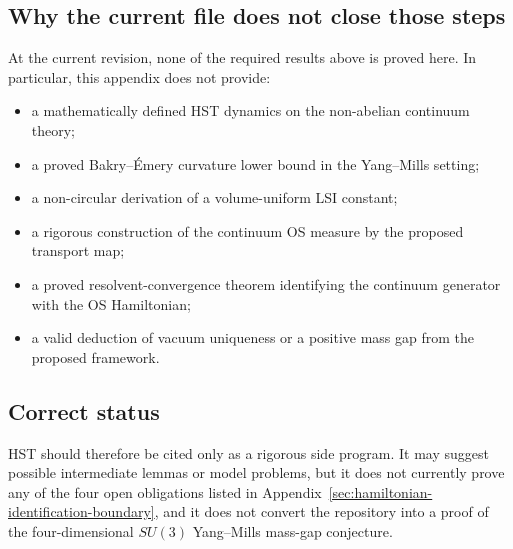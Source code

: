 \subsection{Why the current file does not close those steps}
At the current revision, none of the required results above is proved here.
In particular, this appendix does not provide:
\begin{itemize}
\item a mathematically defined HST dynamics on the non-abelian continuum theory;
\item a proved Bakry--\'Emery curvature lower bound in the Yang--Mills setting;
\item a non-circular derivation of a volume-uniform LSI constant;
\item a rigorous construction of the continuum OS measure by the proposed
transport map;
\item a proved resolvent-convergence theorem identifying the continuum generator
with the OS Hamiltonian;
\item a valid deduction of vacuum uniqueness or a positive mass gap from the
proposed framework.
\end{itemize}

\subsection{Correct status}
HST should therefore be cited only as a rigorous side program. It may suggest
possible intermediate lemmas or model problems, but it does not currently prove
any of the four open obligations listed in
Appendix~\ref{sec:hamiltonian-identification-boundary}, and it does not convert
the repository into a proof of the four-dimensional $SU(3)$ Yang--Mills
mass-gap conjecture.
\endinput
